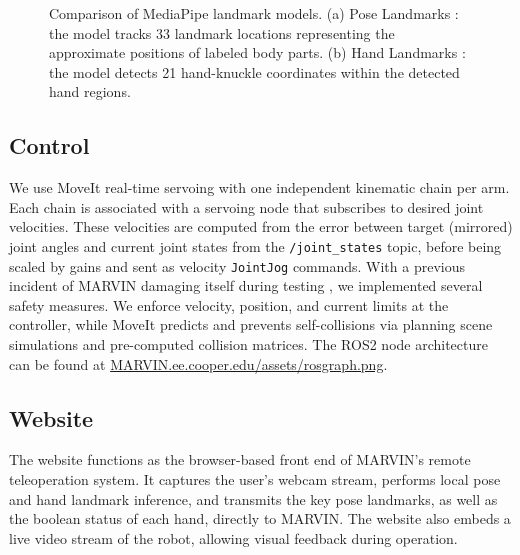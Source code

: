 \documentclass[acmsmall, screen]{acmart}
\begin{document}
\begin{figure}[tbp]
\begin{subfigure}[b]{0.35\linewidth}
  \end{subfigure}
  \caption{Comparison of MediaPipe landmark models. (a) Pose Landmarks \cite{PoseLandmarkDetection}: the model tracks 33 landmark locations representing the approximate positions of labeled body parts. (b) Hand Landmarks \cite{HandLandmarksDetection}: the model detects 21 hand-knuckle coordinates within the detected hand regions.}
  \label{fig:landmarks-comparison}
\end{figure}


\subsection{Control}
We use MoveIt real-time servoing with one independent kinematic chain per arm. Each chain is associated with a servoing node that subscribes to desired joint velocities. These velocities are computed from the error between target (mirrored) joint angles and current joint states from the \texttt{/joint\_states} topic, before being scaled by gains and sent as velocity \texttt{JointJog} commands. With a previous incident of MARVIN damaging itself during testing \cite{rosegebhardtvevoHRI2021Affordable2021}, we implemented several safety measures. We enforce velocity, position, and current limits at the controller, while MoveIt predicts and prevents self-collisions via planning scene simulations and pre-computed collision matrices.
The ROS2 node architecture can be found at \url{MARVIN.ee.cooper.edu/assets/rosgraph.png}.


\subsection{Website}
The website functions as the browser-based front end of MARVIN’s remote teleoperation system. It captures the user’s webcam stream, performs local pose and hand landmark inference, and transmits the key pose landmarks, as well as the boolean status of each hand, directly to MARVIN. The website also embeds a live video stream of the robot, allowing visual feedback during operation. 
\end{document}
